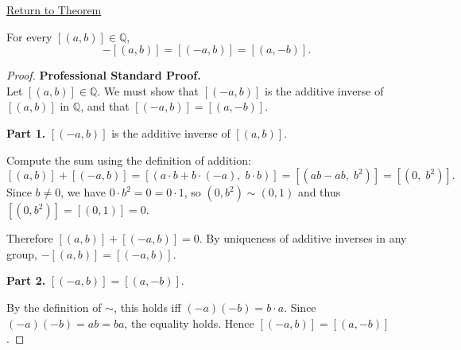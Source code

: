 \newpage
{}
\label{prf:ec-negation}

\begin{remark*}[Return]
\hyperref[thm:ec-negation]{Return to Theorem}
\end{remark*}

\begin{theorem*}
For every $[(a,b)]\in\mathbb{Q}$,
\[
-[(a,b)] = [(-a,b)] = [(a,-b)].
\]
\end{theorem*}

\begin{proof}
\textbf{Professional Standard Proof.}~\\
Let $[(a,b)]\in\mathbb{Q}$. We must show that $[(-a,b)]$ is the additive
inverse of $[(a,b)]$ in $\mathbb{Q}$, and that $[(-a,b)] = [(a,-b)]$.

\textbf{Part 1.} $[(-a,b)]$ is the additive inverse of $[(a,b)]$.

Compute the sum using the definition of addition:
\[
[(a,b)] + [(-a,b)]
= [(a\cdot b + b\cdot(-a),\; b\cdot b)]
= [(ab - ab,\; b^2)]
= [(0,\; b^2)].
\]
Since $b\neq 0$, we have $0\cdot b^2 = 0 = 0\cdot 1$, so $(0,b^2)\sim(0,1)$
and thus $[(0,b^2)] = [(0,1)] = 0$.

Therefore $[(a,b)] + [(-a,b)] = 0$. By uniqueness of additive inverses in
any group, $-[(a,b)] = [(-a,b)]$.

\textbf{Part 2.} $[(-a,b)] = [(a,-b)]$.

By the definition of $\sim$, this holds iff $(-a)(-b) = b\cdot a$. Since
$(-a)(-b) = ab = ba$, the equality holds. Hence $[(-a,b)] = [(a,-b)]$.
\end{proof}

